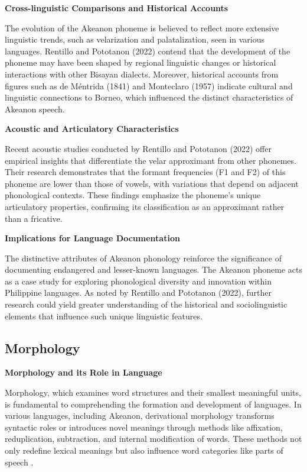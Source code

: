 \textbf{Cross-linguistic Comparisons and Historical Accounts}
  
The evolution of the Akeanon phoneme is believed to reflect more extensive linguistic trends, such as velarization and palatalization, seen in various languages. Rentillo and Pototanon (2022) contend that the development of the phoneme may have been shaped by regional linguistic changes or historical interactions with other Bisayan dialects. Moreover, historical accounts from figures such as de Méntrida (1841) and Monteclaro (1957) indicate cultural and linguistic connections to Borneo, which influenced the distinct characteristics of Akeanon speech.

\textbf{Acoustic and Articulatory Characteristics}  

Recent acoustic studies conducted by Rentillo and Pototanon (2022) offer empirical insights that differentiate the velar approximant from other phonemes. Their research demonstrates that the formant frequencies (F1 and F2) of this phoneme are lower than those of vowels, with variations that depend on adjacent phonological contexts. These findings emphasize the phoneme's unique articulatory properties, confirming its classification as an approximant rather than a fricative.

\textbf{Implications for Language Documentation}  

The distinctive attributes of Akeanon phonology reinforce the significance of documenting endangered and lesser-known languages. The Akeanon phoneme acts as a case study for exploring phonological diversity and innovation within Philippine languages. As noted by Rentillo and Pototanon (2022), further research could yield greater understanding of the historical and sociolinguistic elements that influence such unique linguistic features.

\subsection{Morphology}

\textbf{Morphology and its Role in Language}

Morphology, which examines word structures and their smallest meaningful units, is fundamental to comprehending the formation and development of languages. In various languages, including Akeanon, derivational morphology transforms syntactic roles or introduces novel meanings through methods like affixation, reduplication, subtraction, and internal modification of words. These methods not only redefine lexical meanings but also influence word categories like parts of speech .

